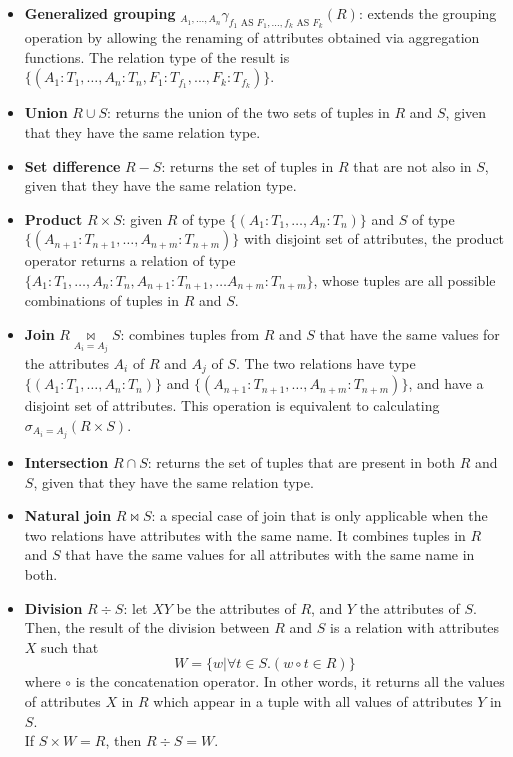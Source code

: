\begin{itemize}
    \item \textbf{Generalized grouping} $_{A_1, \ldots, A_n} \gamma_{f_1 \text{ AS } F_1, \ldots, f_k \text{ AS } F_k} (R)$: extends the grouping operation by allowing the renaming of attributes obtained via aggregation functions. The relation type of the result is $\{(A_1:T_1, \ldots, A_n:T_n, F_1:T_{f_1}, \ldots, F_k:T_{f_k})\}$.
    \item \textbf{Union} $R \cup S$: returns the union of the two sets of tuples in $R$ and $S$, given that they have the same relation type.
    \item \textbf{Set difference} $R - S$: returns the set of tuples in $R$ that are not also in $S$, given that they have the same relation type.
    \item \textbf{Product} $R \times S$: given $R$ of type $\{(A_1:T_1, \ldots, A_n:T_n)\}$ and $S$ of type $\{(A_{n+1}:T_{n+1}, \ldots, A_{n+m}:T_{n+m})\}$ with disjoint set of attributes, the product operator returns a relation of type $\{A_1:T_1, \ldots, A_n:T_n, A_{n+1}:T_{n+1}, \ldots A_{n+m}:T_{n+m}\}$, whose tuples are all possible combinations of tuples in $R$ and $S$.
    \item \textbf{Join} $R \underset{A_i = A_j}{\bowtie} S$: combines tuples from $R$ and $S$ that have the same values for the attributes $A_i$ of $R$ and $A_j$ of $S$. The two relations have type $\{(A_1:T_1, \ldots, A_n:T_n)\}$ and $\{(A_{n+1}:T_{n+1}, \ldots, A_{n+m}:T_{n+m})\}$, and have a disjoint set of attributes. This operation is equivalent to calculating $\sigma_{A_i = A_j} (R \times S)$.
    \item \textbf{Intersection} $R \cap S$: returns the set of tuples that are present in both $R$ and $S$, given that they have the same relation type.
    \item \textbf{Natural join} $R \bowtie S$: a special case of join that is only applicable when the two relations have attributes with the same name. It combines tuples in $R$ and $S$ that have the same values for all attributes with the same name in both.
    \item \textbf{Division} $R \div S$: let $XY$ be the attributes of $R$, and $Y$ the attributes of $S$. Then, the result of the division between $R$ and $S$ is a relation with attributes $X$ such that
        \begin{equation*}
            W = \{ w | \forall t \in S.(w \circ t \in R) \}
        \end{equation*}
    where $\circ$ is the concatenation operator. In other words, it returns all the values of attributes $X$ in $R$ which appear in a tuple with all values of attributes $Y$ in $S$. \\
    If $S \times W = R$, then $R \div S = W$.
\end{itemize}
